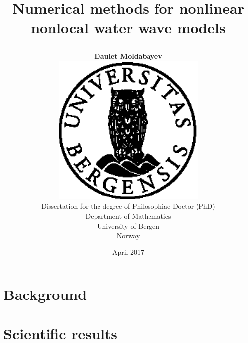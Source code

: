 \documentclass[10pt]{book}
\title{
{\fontsize{28}{30}\usefont{OT1}{phv}{bc}{n}\selectfont Numerical methods for nonlinear nonlocal water wave models}
	\author{
	\textbf{Daulet Moldabayev}\vspace{3cm}\\
		\includegraphics[width=74mm]{figurer/uglo}\vspace{1em}\\
		Dissertation for the degree of Philosophiae Doctor (PhD)\vspace{3.5em}\\
		Department of Mathematics \\
		University of Bergen \\
		Norway
	}
	\date{April 2017}
}
\theoremstyle{plain}
\begin{document}

\ifDownscaledFinalDoc
	\fontsize{\TextSize}{\BaseLineSkip}
	\selectfont
\fi

\ifDraft
	\doublespacing
\fi


\maketitle
\frontmatter
%


%

%
\tableofcontents

\mainmatter

%
%
\part{Background}

%
%


\backmatter

%
%

%
%
%

%
%




\part{Scientific results}
\end{document}
